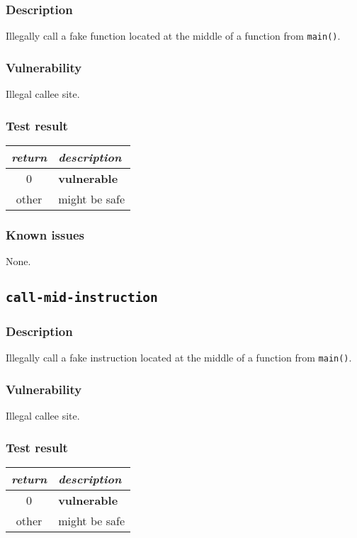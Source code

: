 \documentclass[a4paper]{book}
\begin{document}
\subsubsection{Description}
Illegally call a fake function located at the middle of a function from \texttt{main()}.

\subsubsection{Vulnerability}
Illegal callee site.

\subsubsection{Test result}
\begin{tabular}{cl}
  \toprule
  \emph{return}  & \emph{description} \\
  \midrule
  0              & \textbf{vulnerable} \\
  other          & might be safe \\
  \bottomrule
\end{tabular}
  
\subsubsection{Known issues}

None.

\newpage
\subsection{\texttt{call-mid-instruction}}\label{test-call-mid-instruction}

\subsubsection{Description}
Illegally call a fake instruction located at the middle of a function from \texttt{main()}.

\subsubsection{Vulnerability}
Illegal callee site.

\subsubsection{Test result}
\begin{tabular}{cl}
  \toprule
  \emph{return}  & \emph{description} \\
  \midrule
  0              & \textbf{vulnerable} \\
  other          & might be safe \\
  \bottomrule
\end{tabular}
  
\end{document}
